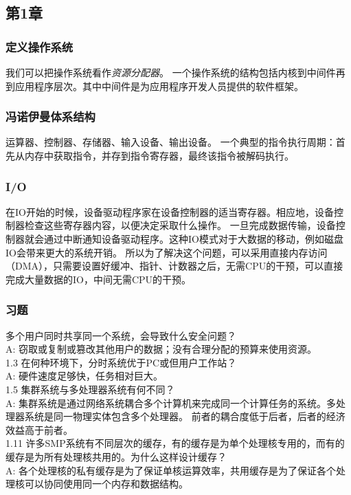 \documentclass[../main.tex]{subfiles}
\begin{document}
    \subsection{第1章}
    \subsubsection{定义操作系统}
    我们可以把操作系统看作\emph{资源分配器}。
    一个操作系统的结构包括内核到中间件再到应用程序层次。其中中间件是为应用程序开发人员提供的软件框架。
    \subsubsection{冯诺伊曼体系结构}
    运算器、控制器、存储器、输入设备、输出设备。
    一个典型的指令执行周期：首先从内存中获取指令，并存到指令寄存器，最终该指令被解码执行。
    \subsubsection{I/O}
    在IO开始的时候，设备驱动程序家在设备控制器的适当寄存器。相应地，设备控制器检查这些寄存器内容，以便决定采取什么操作。
    一旦完成数据传输，设备控制器就会通过中断通知设备驱动程序。这种IO模式对于大数据的移动，例如磁盘IO会带来更大的系统开销。
    所以为了解决这个问题，可以采用直接内存访问（DMA），只需要设置好缓冲、指针、计数器之后，无需CPU的干预，可以直接完成大量数据的IO，中间无需CPU的干预。
    \subsubsection{习题}
     多个用户同时共享同一个系统，会导致什么安全问题？\\
    A: 窃取或复制或篡改其他用户的数据；没有合理分配的预算来使用资源。 \\
    1.3 在何种环境下，分时系统优于PC或但用户工作站？ \\
    A: 硬件速度足够快，任务相对巨大。 \\
    1.5 集群系统与多处理器系统有何不同？ \\
    A: 集群系统是通过网络系统耦合多个计算机来完成同一个计算任务的系统。多处理器系统是同一物理实体包含多个处理器。
    前者的耦合度低于后者，后者的经济效益高于前者。 \\
    1.11 许多SMP系统有不同层次的缓存，有的缓存是为单个处理核专用的，而有的缓存是为所有处理核共用的。为什么这样设计缓存？ \\
    A: 各个处理核的私有缓存是为了保证单核运算效率，共用缓存是为了保证各个处理核可以协同使用同一个内存和数据结构。
\end{document}
